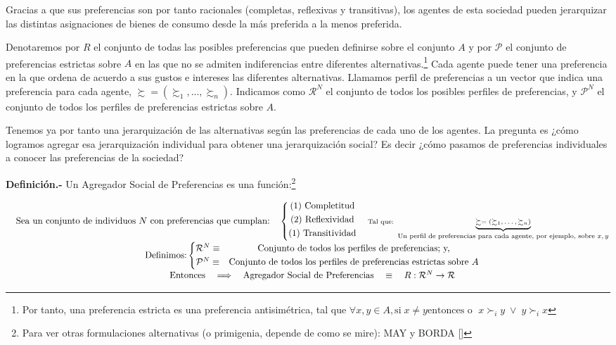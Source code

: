 \documentclass[10pt,a4paper]{article}
\newcommand{\authorfont}[1]{{\fontfamily{EBGaramond-TLF}\selectfont #1}}
\begin{document}
Gracias a que sus preferencias son por tanto racionales (completas, reflexivas y transitivas), los agentes de esta sociedad pueden jerarquizar las distintas asignaciones de bienes de consumo desde la más preferida a la menos preferida.

Denotaremos por $R$ el conjunto de todas las posibles preferencias que pueden definirse sobre el conjunto $A$ y por $\mathcal{P}$ el conjunto de preferencias estrictas sobre $A$ en las que no se admiten indiferencias entre diferentes alternativas.\footnote{%
    Por tanto, una preferencia estricta es una preferencia antisimétrica, tal que $\forall x,y \in A, \text{si}\; x\neq y \text{entonces o }\; x\succ_i y\; \vee\; y\succ_i x$
} Cada agente puede tener una preferencia en la que ordena de acuerdo a sus gustos e intereses las diferentes alternativas. Llamamos perfil de preferencias a un vector que indica una preferencia para cada agente, $\succsim = (\succsim_1 , . . . , \succsim_n)$. Indicamos como $\mathcal{R}^N$ el conjunto de todos los posibles perfiles de preferencias, y $\mathcal{P}^N$ el conjunto de todos los perfiles de preferencias estrictas sobre $A$.

Tenemos ya por tanto una jerarquización de las alternativas según las preferencias de cada uno de los agentes. La pregunta es ¿cómo logramos agregar esa jerarquización individual para obtener una jerarquización social? Es decir ¿cómo pasamos de preferencias individuales a conocer las preferencias de la sociedad? 

\textbf{Definición.-} Un Agregador Social de Preferencias es una función:\footnote{%
    Para ver otras formulaciones alternativas (o primigenia, depende de como se mire): MAY y BORDA [\authorfont{[Ver Anexo \ref{anx:reglamayoria}]}]
}

$$\begin{matrix}
&\text{Sea un conjunto de individuos $N$ con preferencias que cumplan:}\quad 
\left\{\begin{matrix}
    \text{(1)   Completitud}\\[0.3em]
    \text{(2)   Reflexividad}\\[0.3em]
    \text{(1)   Transitividad}\\[0.3em]
\end{matrix}\right.\quad {\scriptsize \text{\scriptsize Tal que:} \; \underbrace{\succsim=(\succsim_1, \ldots,  \succsim_n)}_{\text{Un perfil de preferencias para cada agente, por ejemplo, sobre $x,y$}}}\\[0.5em]
&\text{Definimos:}
\left\{\begin{matrix}
    \mathcal{R}^N \equiv &\text{Conjunto de todos los perfiles de preferencias; y,}\\[0.3em]
    \mathcal{P}^N \equiv &\text{Conjunto de todos los perfiles de preferencias estrictas sobre $A$}\\
\end{matrix}\right.\\[1em]
&\text{Entonces} \quad \Longrightarrow \quad \text{Agregador Social de Preferencias} \quad \equiv \quad R: \mathcal{R}^N\rightarrow \mathcal{R}
\end{matrix}$$
\end{document}
